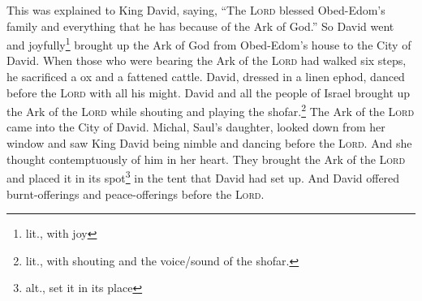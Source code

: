 \begin{inparaenum}
     This was explained to King David, saying, ``The \textsc{Lord} blessed Obed-Edom's family and everything that he has because of the Ark of God.'' So David went and joyfully\footnote{lit., with joy} brought up the Ark of God from Obed-Edom's house to the City of David.%
     When those who were bearing the Ark of the \textsc{Lord} had walked six steps, he sacrificed a ox and a fattened cattle.%
     David, dressed in a linen ephod, danced before the \textsc{Lord} with all his might.%
     David and all the people of Israel brought up the Ark of the \textsc{Lord} while shouting and playing the shofar.\footnote{lit., with shouting and the voice/sound of the shofar.}%
     The Ark of the \textsc{Lord} came into the City of David. Michal, Saul's daughter, looked down from her window and saw King David being nimble and dancing before the \textsc{Lord}. And she thought contemptuously of him in her heart.%
     They brought the Ark of the \textsc{Lord} and placed it in its spot\footnote{alt., set it in its place} in the tent that David had set up. And David offered burnt-offerings and peace-offerings before the \textsc{Lord}.%
\end{inparaenum}
